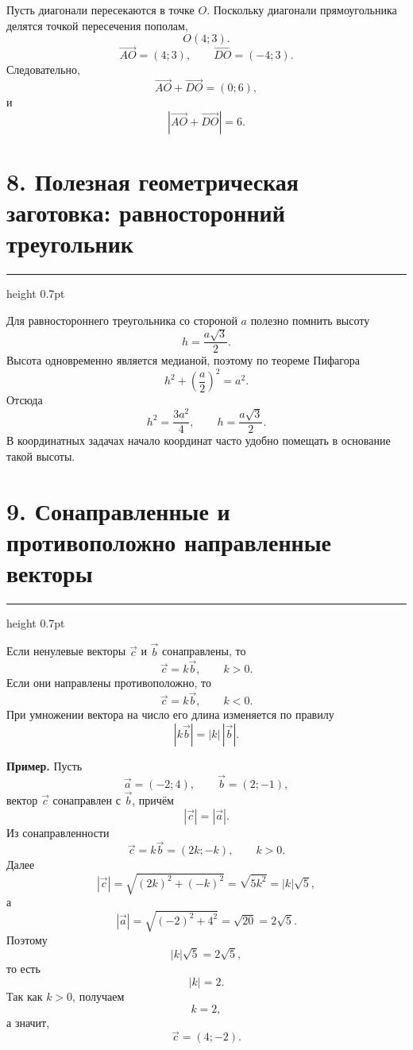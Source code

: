 \documentclass[a4paper,12pt]{article}
\newcommand{\vect}[1]{\vec{#1}}
\newcommand{\sectionrule}{%
  \par\vspace{1mm}%
  {\color{accent!60}\hrule height 0.7pt}%
  \vspace{3mm}%
}
\begin{document}
Пусть диагонали пересекаются в точке \(O\). Поскольку диагонали прямоугольника делятся точкой пересечения пополам,
\[
O(4;3).
\]
\[
\overrightarrow{AO}=(4;3),
\qquad
\overrightarrow{DO}=(-4;3).
\]
Следовательно,
\[
\overrightarrow{AO}+\overrightarrow{DO}=(0;6),
\]
и
\[
\boxed{
\left|
\overrightarrow{AO}+\overrightarrow{DO}
\right|=6
}.
\]

\begin{center}
\end{center}

\clearpage
\section*{8. Полезная геометрическая заготовка: равносторонний треугольник}
\sectionrule

Для равностороннего треугольника со стороной \(a\) полезно помнить высоту
\[
\boxed{h=\frac{a\sqrt3}{2}}.
\]
Высота одновременно является медианой, поэтому по теореме Пифагора
\[
h^2+\left(\frac a2\right)^2=a^2.
\]
Отсюда
\[
h^2=\frac{3a^2}{4},
\qquad
h=\frac{a\sqrt3}{2}.
\]
В координатных задачах начало координат часто удобно помещать в основание такой высоты.

\section*{9. Сонаправленные и противоположно направленные векторы}
\sectionrule

Если ненулевые векторы \(\vect c\) и \(\vect b\) сонаправлены, то
\[
\boxed{
\vect c=k\vect b,
\qquad
k>0
}.
\]
Если они направлены противоположно, то
\[
\boxed{
\vect c=k\vect b,
\qquad
k<0
}.
\]
При умножении вектора на число его длина изменяется по правилу
\[
\boxed{|k\vect b|=|k|\,|\vect b|}.
\]

\textbf{Пример.}
Пусть
\[
\vect a=(-2;4),
\qquad
\vect b=(2;-1),
\]
вектор \(\vect c\) сонаправлен с \(\vect b\), причём
\[
|\vect c|=|\vect a|.
\]
Из сонаправленности
\[
\vect c=k\vect b=(2k;-k),
\qquad
k>0.
\]
Далее
\[
|\vect c|
=\sqrt{(2k)^2+(-k)^2}
=\sqrt{5k^2}
=|k|\sqrt5,
\]
а
\[
|\vect a|
=\sqrt{(-2)^2+4^2}
=\sqrt{20}
=2\sqrt5.
\]
Поэтому
\[
|k|\sqrt5=2\sqrt5,
\]
то есть
\[
|k|=2.
\]
Так как \(k>0\), получаем
\[
k=2,
\]
а значит,
\[
\boxed{\vect c=(4;-2)}.
\]
\end{document}

